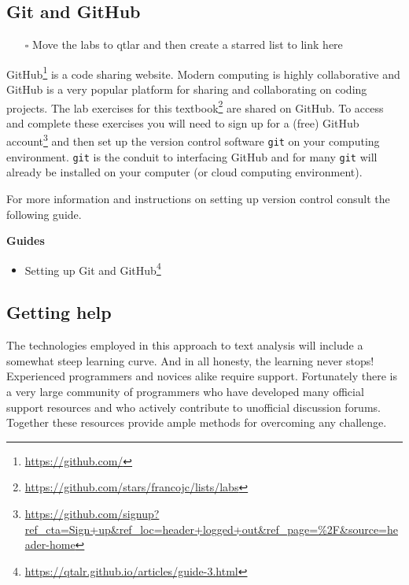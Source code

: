 \documentclass[
  letterpaper,
]{latex/krantz}
\providecommand{\tightlist}{%
  \setlength{\itemsep}{0pt}\setlength{\parskip}{0pt}}\usepackage{longtable,booktabs,array}
\DeclareRobustCommand{\href}[2]{#2\footnote{\url{#1}}}
\begin{document}
\hypertarget{git-and-github}{%
\subsection*{Git and GitHub}\label{git-and-github}}

\begin{itemize}
\tightlist
\item[$\square$]
  Move the labs to qtlar and then create a starred list to link here
\end{itemize}

\href{https://github.com/}{GitHub} is a code sharing website. Modern
computing is highly collaborative and GitHub is a very popular platform
for sharing and collaborating on coding projects. The
\href{https://github.com/stars/francojc/lists/labs}{lab exercises for
this textbook} are shared on GitHub. To access and complete these
exercises you will need to
\href{https://github.com/signup?ref_cta=Sign+up\&ref_loc=header+logged+out\&ref_page=\%2F\&source=header-home}{sign
up for a (free) GitHub account} and then set up the version control
software \texttt{git} on your computing environment. \texttt{git} is the
conduit to interfacing GitHub and for many \texttt{git} will already be
installed on your computer (or cloud computing environment).

For more information and instructions on setting up version control
consult the following guide.

\begin{tcolorbox}[enhanced jigsaw, left=2mm, arc=.35mm, colback=white, rightrule=.15mm, toprule=.15mm, breakable, leftrule=.75mm, opacityback=0, bottomrule=.15mm]

\textbf{ Guides}

\begin{itemize}
\tightlist
\item
  \href{https://qtalr.github.io/articles/guide-3.html}{Setting up Git
  and GitHub}
\end{itemize}

\end{tcolorbox}

\hypertarget{getting-help}{%
\subsection*{Getting help}\label{getting-help}}

The technologies employed in this approach to text analysis will include
a somewhat steep learning curve. And in all honesty, the learning never
stops! Experienced programmers and novices alike require support.
Fortunately there is a very large community of programmers who have
developed many official support resources and who actively contribute to
unofficial discussion forums. Together these resources provide ample
methods for overcoming any challenge.
\end{document}
